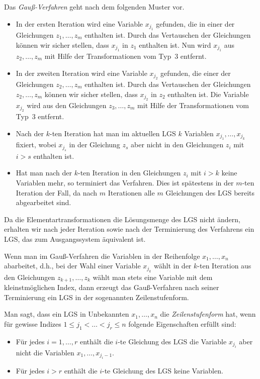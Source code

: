 \begin{framed} 
	Das \emph{Gauß-Verfahren} geht nach dem folgenden Muster vor.
	
	\begin{itemize} 
		\item In der ersten Iteration wird eine Variable $x_{j_1}$ gefunden, die in einer der Gleichungen $z_1,\ldots,z_m$ enthalten ist. Durch das Vertauschen der Gleichungen können wir sicher stellen, dass $x_{j_1}$ in $z_1$ enthalten ist. Nun wird $x_{j_1}$ aus $z_2,\ldots,z_m$ mit Hilfe der Transformationen vom Typ~3 entfernt. 
	
		\item In der zweiten Iteration wird eine Variable $x_{j_2}$ gefunden, die einer der Gleichungen $z_2,\ldots,z_m$ enthalten ist. Durch das Vertauschen der Gleichungen $z_2,\ldots,z_m$ können wir sicher stellen, dass $x_{j_2}$ in $z_2$ enthalten ist. Die Variable $x_{j_2}$ wird aus den Gleichungen $z_3,\ldots,z_m$ mit Hilfe der Transformationen vom Typ~3 entfernt. 
	
		\item Nach der $k$-ten Iteration hat man im aktuellen LGS $k$ Variablen $x_{j_1},\ldots,x_{j_k}$ fixiert, wobei $x_{j_s}$ in der Gleichung $z_s$ aber nicht in den Gleichungen $z_i$ mit $i > s$ enthalten ist. 
		\item 	Hat man nach der $k$-ten Iteration in den Gleichungen $z_i$ mit $i > k$ keine Variablen mehr, so terminiert das Verfahren. Dies ist spätestens in der $m$-ten Iteration der Fall, da nach $m$ Iterationen alle $m$ Gleichungen des LGS bereits abgearbeitet sind. 
	\end{itemize} 
	
	Da die Elementartransformationen die Lösungsmenge des LGS nicht ändern, erhalten wir nach jeder Iteration sowie nach der Terminierung des Verfahrens ein LGS, das zum Ausgangssystem äquivalent ist. 
	\end{framed}

Wenn man im Gauß-Verfahren die Variablen in der Reihenfolge $x_1,\ldots,x_n$ abarbeitet, d.h., bei der Wahl einer Variable $x_{j_k}$ wählt in der $k$-ten Iteration aus den Gleichungen $z_{k+1},\ldots,z_k$ wählt man stets eine Variable mit dem kleinstmöglichen Index, dann erzeugt das Gauß-Verfahren nach seiner Terminierung ein LGS in der sogenannten Zeilenstufenform. 

Man sagt, dass ein LGS  in Unbekannten $x_1,\ldots,x_n$ die \emph{Zeilenstufenform} hat, wenn für gewisse Indizes $1 \le j_1 < \ldots < j_r \le n$ folgende Eigenschaften erfüllt sind: 
\begin{itemize}
	\item Für jedes $i=1,\ldots,r$ enthält die $i$-te Gleichung des LGS die Variable $x_{j_i}$ aber nicht die Variablen $x_1,\ldots,x_{j_i-1}$. 
	\item Für jedes $i>r$ enthält die $i$-te Gleichung des LGS keine Variablen. 
\end{itemize}

